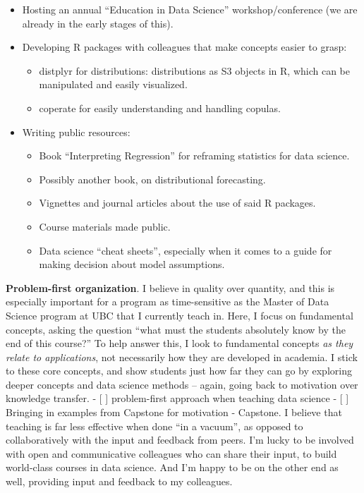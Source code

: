 \documentclass[]{book}
\providecommand{\tightlist}{%
  \setlength{\itemsep}{0pt}\setlength{\parskip}{0pt}}
\begin{document}
\begin{itemize}
\tightlist
\item
  Hosting an annual ``Education in Data Science'' workshop/conference (we are already in the early stages of this).
\item
  Developing R packages with colleagues that make concepts easier to grasp:

  \begin{itemize}
  \tightlist
  \item
    distplyr for distributions: distributions as S3 objects in R, which can be manipulated and easily visualized.
  \item
    coperate for easily understanding and handling copulas.
  \end{itemize}
\item
  Writing public resources:

  \begin{itemize}
  \tightlist
  \item
    Book ``Interpreting Regression'' for reframing statistics for data science.
  \item
    Possibly another book, on distributional forecasting.
  \item
    Vignettes and journal articles about the use of said R packages.
  \item
    Course materials made public.
  \item
    Data science ``cheat sheets'', especially when it comes to a guide for making decision about model assumptions.
  \end{itemize}
\end{itemize}

\textbf{Problem-first organization}. I believe in quality over quantity, and this is especially important for a program as time-sensitive as the Master of Data Science program at UBC that I currently teach in. Here, I focus on fundamental concepts, asking the question ``what must the students absolutely know by the end of this course?'' To help answer this, I look to fundamental concepts \emph{as they relate to applications}, not necessarily how they are developed in academia. I stick to these core concepts, and show students just how far they can go by exploring deeper concepts and data science methods -- again, going back to motivation over knowledge transfer.
- {[} {]} problem-first approach when teaching data science
- {[} {]} Bringing in examples from Capstone for motivation
- Capstone. I believe that teaching is far less effective when done ``in a vacuum'', as opposed to collaboratively with the input and feedback from peers. I'm lucky to be involved with open and communicative colleagues who can share their input, to build world-class courses in data science. And I'm happy to be on the other end as well, providing input and feedback to my colleagues.
\end{document}
